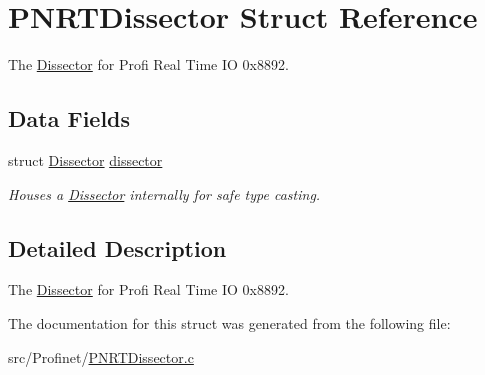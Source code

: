 \hypertarget{struct_p_n_r_t_dissector}{\section{P\-N\-R\-T\-Dissector Struct Reference}
\label{struct_p_n_r_t_dissector}
}


The \hyperlink{struct_dissector}{Dissector} for Profi Real Time I\-O 0x8892.  


\subsection*{Data Fields}
\begin{DoxyCompactItemize}
\item 
\hypertarget{struct_p_n_r_t_dissector_a2ec7a75e801e4a714f32310cdf37546f}{struct \hyperlink{struct_dissector}{Dissector} \hyperlink{struct_p_n_r_t_dissector_a2ec7a75e801e4a714f32310cdf37546f}{dissector}}\label{struct_p_n_r_t_dissector_a2ec7a75e801e4a714f32310cdf37546f}

\begin{DoxyCompactList}\small\item\em Houses a \hyperlink{struct_dissector}{Dissector} internally for safe type casting. \end{DoxyCompactList}\end{DoxyCompactItemize}


\subsection{Detailed Description}
The \hyperlink{struct_dissector}{Dissector} for Profi Real Time I\-O 0x8892. 

The documentation for this struct was generated from the following file\-:\begin{DoxyCompactItemize}
\item 
src/\-Profinet/\hyperlink{_p_n_r_t_dissector_8c}{P\-N\-R\-T\-Dissector.\-c}\end{DoxyCompactItemize}
